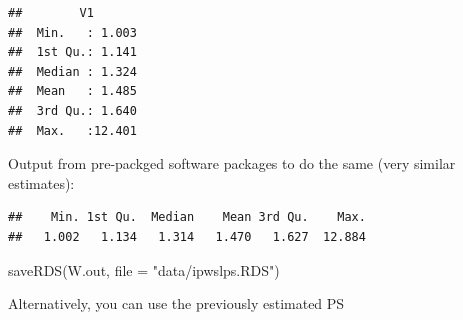 \documentclass[
]{book}
\newenvironment{Shaded}{\begin{snugshade}}{\end{snugshade}}
\newcommand{\AttributeTok}[1]{\textcolor[rgb]{0.77,0.63,0.00}{#1}}
\newcommand{\FunctionTok}[1]{\textcolor[rgb]{0.00,0.00,0.00}{#1}}
\newcommand{\NormalTok}[1]{#1}
\newcommand{\OtherTok}[1]{\textcolor[rgb]{0.56,0.35,0.01}{#1}}
\newcommand{\SpecialCharTok}[1]{\textcolor[rgb]{0.00,0.00,0.00}{#1}}
\newcommand{\StringTok}[1]{\textcolor[rgb]{0.31,0.60,0.02}{#1}}
\begin{document}
\begin{verbatim}
##        V1        
##  Min.   : 1.003  
##  1st Qu.: 1.141  
##  Median : 1.324  
##  Mean   : 1.485  
##  3rd Qu.: 1.640  
##  Max.   :12.401
\end{verbatim}

Output from pre-packged software packages to do the same (very similar estimates):

\begin{Shaded}
\end{Shaded}

\begin{verbatim}
##    Min. 1st Qu.  Median    Mean 3rd Qu.    Max. 
##   1.002   1.134   1.314   1.470   1.627  12.884
\end{verbatim}

\begin{Shaded}
\begin{Highlighting}[]
\FunctionTok{saveRDS}\NormalTok{(W.out, }\AttributeTok{file =} \StringTok{"data/ipwslps.RDS"}\NormalTok{)}
\end{Highlighting}
\end{Shaded}

Alternatively, you can use the previously estimated PS

\begin{Shaded}
\end{Shaded}
\end{document}
